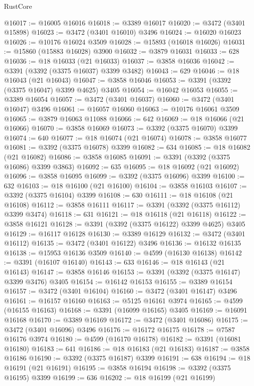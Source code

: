 \begin{lexlean}{RustCore}
\begin{coremodule}
@16017 := @16005 @16016
@16018 := @3389 @16017
@16020 := @3472 (@3401 @15898)
@16023 := @3472 (@3401 @16010) @3496
@16024 := @16020 @16023
@16026 := @10176 @16024 @3509
@16028 := @15893 (@16018 @16026)
@16031 := @15860 (@15883 @16028) @3900
@16032 := @3879 @16031
@16033 := 628
@16036 := @18 @16033 (@21 @16033)
@16037 := @3858 @16036
@16042 := @3391 (@3392 (@3375 @16037) @3399 @3482)
@16043 := 629
@16046 := @18 @16043 (@21 @16043)
@16047 := @3858 @16046
@16053 := @3391 (@3392 (@3375 @16047) @3399 @4625) @3405
@16054 := @16042 @16053
@16055 := @3389 @16054
@16057 := @3472 (@3401 @16037)
@16060 := @3472 (@3401 @16047) @3496
@16061 := @16057 @16060
@16063 := @10176 @16061 @3509
@16065 := @3879 @16063 @11088
@16066 := 642
@16069 := @18 @16066 (@21 @16066)
@16070 := @3858 @16069
@16073 := @3392 (@3375 @16070) @3399
@16074 := 640
@16077 := @18 @16074 (@21 @16074)
@16078 := @3858 @16077
@16081 := @3392 (@3375 @16078) @3399
@16082 := 634
@16085 := @18 @16082 (@21 @16082)
@16086 := @3858 @16085
@16091 := @3391 (@3392 (@3375 @16086) @3399 @3863)
@16092 := 635
@16095 := @18 @16092 (@21 @16092)
@16096 := @3858 @16095
@16099 := @3392 (@3375 @16096) @3399
@16100 := 632
@16103 := @18 @16100 (@21 @16100)
@16104 := @3858 @16103
@16107 := @3392 (@3375 @16104) @3399
@16108 := 630
@16111 := @18 @16108 (@21 @16108)
@16112 := @3858 @16111
@16117 := @3391 (@3392 (@3375 @16112) @3399 @3474)
@16118 := 631
@16121 := @18 @16118 (@21 @16118)
@16122 := @3858 @16121
@16128 := @3391 (@3392 (@3375 @16122) @3399 @4625) @3405
@16129 := @16117 @16128
@16130 := @3389 @16129
@16132 := @3472 (@3401 @16112)
@16135 := @3472 (@3401 @16122) @3496
@16136 := @16132 @16135
@16138 := @15953 @16136 @3509
@16140 := @4599 (@16130 @16138)
@16142 := @3391 (@16107 @16140)
@16143 := 633
@16146 := @18 @16143 (@21 @16143)
@16147 := @3858 @16146
@16153 := @3391 (@3392 (@3375 @16147) @3399 @3476) @3405
@16154 := @16142 @16153
@16155 := @3389 @16154
@16157 := @3472 (@3401 @16104)
@16160 := @3472 (@3401 @16147) @3496
@16161 := @16157 @16160
@16163 := @5125 @16161 @3974
@16165 := @4599 (@16155 @16163)
@16168 := @3391 (@16099 @16165) @3405
@16169 := @16091 @16168
@16170 := @3389 @16169
@16172 := @3472 (@3401 @16086)
@16175 := @3472 (@3401 @16096) @3496
@16176 := @16172 @16175
@16178 := @7587 @16176 @3974
@16180 := @4599 (@16170 @16178)
@16182 := @3391 (@16081 @16180)
@16183 := 641
@16186 := @18 @16183 (@21 @16183)
@16187 := @3858 @16186
@16190 := @3392 (@3375 @16187) @3399
@16191 := 638
@16194 := @18 @16191 (@21 @16191)
@16195 := @3858 @16194
@16198 := @3392 (@3375 @16195) @3399
@16199 := 636
@16202 := @18 @16199 (@21 @16199)

\end{coremodule}
\end{lexlean}
